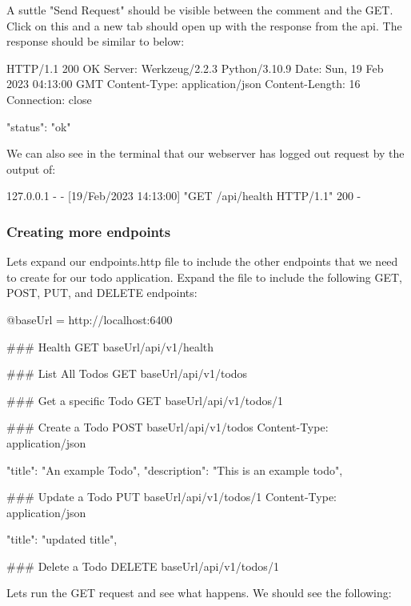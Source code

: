 \documentclass{csse4400}
\begin{document}
A suttle "Send Request" should be visible between the comment and the GET. Click on this and a new tab should open up with the response from the api. The response should be similar to below:

\begin{code}[language=json,numbers=none]{}
  HTTP/1.1 200 OK
  Server: Werkzeug/2.2.3 Python/3.10.9
  Date: Sun, 19 Feb 2023 04:13:00 GMT
  Content-Type: application/json
  Content-Length: 16
  Connection: close
    
  {
    "status": "ok"
  }
\end{code}

We can also see in the terminal that our webserver has logged out request by the output of:

\begin{code}[language=bash,numbers=none]{}
  127.0.0.1 - - [19/Feb/2023 14:13:00] "GET /api/health HTTP/1.1" 200 -
\end{code}

\subsubsection{Creating more endpoints}

Lets expand our endpoints.http file to include the other endpoints that we need to create for our todo application. Expand the file to include the following GET, POST, PUT, and DELETE endpoints:

\begin{code}[numbers=none]{}
  @baseUrl = http://localhost:6400

  ### Health
  GET {{baseUrl}}/api/v1/health
  
  ### List All Todos
  GET {{baseUrl}}/api/v1/todos
  
  ### Get a specific Todo
  GET {{baseUrl}}/api/v1/todos/1
  
  ### Create a Todo
  POST {{baseUrl}}/api/v1/todos
  Content-Type: application/json
  
  {
      "title": "An example Todo",
      "description": "This is an example todo",
  }
  
  ### Update a Todo
  PUT {{baseUrl}}/api/v1/todos/1
  Content-Type: application/json
  
  {
      "title": "updated title",
  }
  
  ### Delete a Todo
  DELETE {{baseUrl}}/api/v1/todos/1
  
\end{code}

Lets run the GET request and see what happens. We should see the following:
\end{document}
